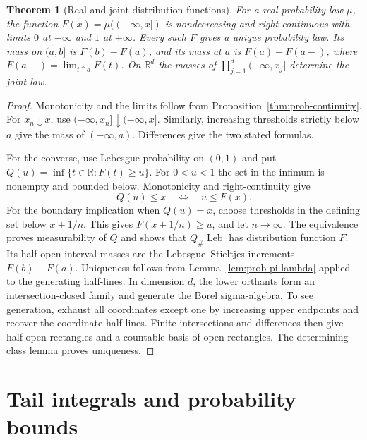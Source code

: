 \documentclass[11pt,oneside,openany]{book}
\theoremstyle{plain}
\newtheorem{theorem}{Theorem}[chapter]
\theoremstyle{definition}
\theoremstyle{remark}
\begin{document}
\begin{theorem}[Real and joint distribution functions]
\label{thm:prob-cdf}
For a real probability law \(\mu\), the function
\(F(x)=\mu((-\infty,x])\) is nondecreasing and right-continuous with limits
\(0\) at \(-\infty\) and \(1\) at \(+\infty\). Every such \(F\) gives a
unique probability law. Its mass on \((a,b]\) is \(F(b)-F(a)\), and
its mass at \(a\) is \(F(a)-F(a-)\), where
\(F(a-)=\lim_{t\uparrow a}F(t)\). On \(\mathbb R^d\) the masses of
\(\prod_{j=1}^{d}(-\infty,x_j]\) determine the joint law.
\end{theorem}
\begin{proof}
Monotonicity and the limits follow from
Proposition~\ref{thm:prob-continuity}. For \(x_n\downarrow x\), use
\((-\infty,x_n]\downarrow(-\infty,x]\). Similarly, increasing thresholds
strictly below \(a\) give the mass of \((-\infty,a)\). Differences give
the two stated formulas.

For the converse, use Lebesgue probability on \((0,1)\) and put
\(Q(u)=\inf\{t\in\mathbb R:F(t)\ge u\}\). For \(0<u<1\) the set in
the infimum is nonempty and bounded below. Monotonicity and
right-continuity give
\[
 Q(u)\le x \quad\Longleftrightarrow\quad u\le F(x).
\]
For the boundary implication when \(Q(u)=x\), choose thresholds in the
defining set below \(x+1/n\). This gives \(F(x+1/n)\ge u\), and let
\(n\to\infty\). The equivalence proves measurability of \(Q\) and shows
that \(Q_\#\operatorname{Leb}\) has distribution function \(F\).
Its half-open interval masses are the Lebesgue--Stieltjes increments
\(F(b)-F(a)\). Uniqueness follows from
Lemma~\ref{lem:prob-pi-lambda} applied to the generating half-lines.
In dimension \(d\), the lower orthants form an intersection-closed
family and generate the Borel sigma-algebra. To see generation, exhaust
all coordinates except one by increasing upper endpoints and recover
the coordinate half-lines. Finite intersections and differences then
give half-open rectangles and a countable basis of open rectangles.
The determining-class lemma proves uniqueness.
\end{proof}

\section{Tail integrals and probability bounds}
\label{p01-04}
\end{document}
